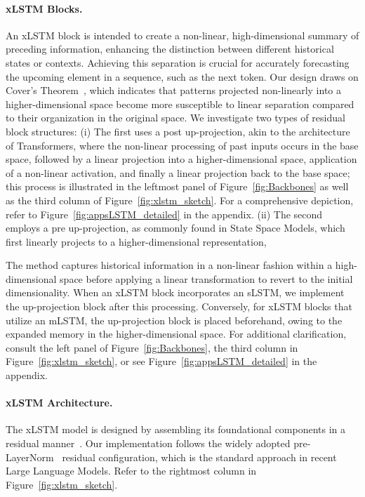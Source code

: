 \paragraph{xLSTM Blocks.}
\label{sec:xLSTMblock}
An xLSTM block is intended to create a non-linear, high-dimensional summary of preceding information, enhancing the distinction between different historical states or contexts. Achieving this separation is crucial for accurately forecasting the upcoming element in a sequence, such as the next token. Our design draws on Cover’s Theorem~\citep{Cover:65}, which indicates that patterns projected non-linearly into a higher-dimensional space become more susceptible to linear separation compared to their organization in the original space. We investigate two types of residual block structures: (i) The first uses a post up-projection, akin to the architecture of Transformers, where the non-linear processing of past inputs occurs in the base space, followed by a linear projection into a higher-dimensional space, application of a non-linear activation, and finally a linear projection back to the base space; this process is illustrated in the leftmost panel of Figure~\ref{fig:Backbones} as well as the third column of Figure~\ref{fig:xlstm_sketch}. For a comprehensive depiction, refer to Figure~\ref{fig:appsLSTM_detailed} in the appendix. (ii) The second employs a pre up-projection, as commonly found in State Space Models, which first linearly projects to a higher-dimensional representation,

The method captures historical information in a non-linear fashion within a high-dimensional space before applying a linear transformation to revert to the initial dimensionality. When an xLSTM block incorporates an sLSTM, we implement the up-projection block after this processing. Conversely, for xLSTM blocks that utilize an mLSTM, the up-projection block is placed beforehand, owing to the expanded memory in the higher-dimensional space. For additional clarification, consult the left panel of Figure~\ref{fig:Backbones}, the third column in Figure~\ref{fig:xlstm_sketch}, or see Figure~\ref{fig:appsLSTM_detailed} in the appendix.

\paragraph{xLSTM Architecture. }
\label{sec:xLSTMarchitecure}
The xLSTM model is designed by assembling its foundational components in a residual manner~\citep{Srivastava:15,He:16}. Our implementation follows the widely adopted pre-LayerNorm~\citep{Ba:16b} residual configuration, which is the standard approach in recent Large Language Models. Refer to the rightmost column in Figure~\ref{fig:xlstm_sketch}.

